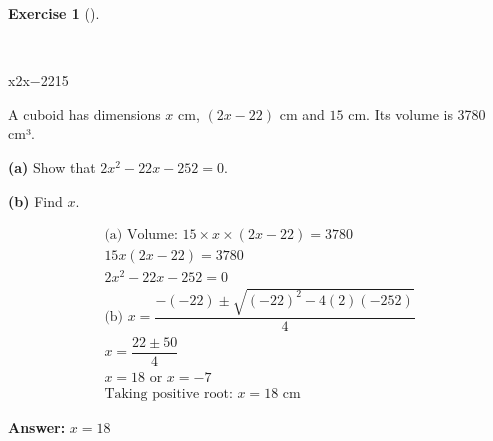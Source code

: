 \documentclass[
  letterpaper,
  DIV=11,
  numbers=noendperiod]{scrreprt}
\theoremstyle{definition}
\newtheorem{exercise}{Exercise}[chapter]
\theoremstyle{remark}
\begin{document}
\begin{exercise}[]\protect\hypertarget{exr-u6-32-2}{}\label{exr-u6-32-2}

~

x2x−2215

A cuboid has dimensions \(x\) cm, \((2x - 22)\) cm and \(15\) cm. Its
volume is 3780 cm³.

\textbf{(a)} Show that \(2x^2 - 22x - 252 = 0\).

\textbf{(b)} Find \(x\).

\begin{tcolorbox}[enhanced jigsaw, opacitybacktitle=0.6, coltitle=black, arc=.35mm, colframe=quarto-callout-tip-color-frame, colback=white, bottomrule=.15mm, left=2mm, colbacktitle=quarto-callout-tip-color!10!white, titlerule=0mm, opacityback=0, title=\textcolor{quarto-callout-tip-color}{\faLightbulb}\hspace{0.5em}{🔍 View Solution}, leftrule=.75mm, breakable, rightrule=.15mm, bottomtitle=1mm, toptitle=1mm, toprule=.15mm]

\begin{align*}
\text{(a) Volume: } 15 \times x \times (2x-22) = 3780 \\ 15x(2x-22) = 3780 \\ 2x^2 - 22x - 252 = 0 \\ \text{(b) } x = \dfrac{-(-22) \pm \sqrt{(-22)^2 - 4(2)(-252)}}{4} \\ x = \dfrac{22 \pm 50}{4} \\ x = 18 \text{ or } x = -7 \\ \text{Taking positive root: } x = 18 \text{ cm}
\end{align*}

\textbf{Answer:} \(x = 18\)

\end{tcolorbox}

\end{exercise}
\end{document}
